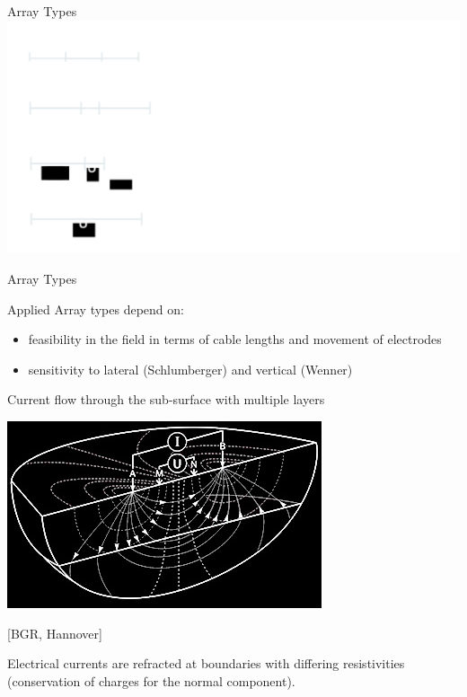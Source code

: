 \begin{frame}{Array Types}
  \includegraphics[width=0.9\linewidth]{Figures/Resistivity/ArrayTypes.png}
\end{frame}

\begin{frame}{Array Types}
  \begin{PointSix}
    Applied Array types depend on:
    \begin{itemize}
      \item feasibility in the field in terms of cable lengths and movement of electrodes
      \item sensitivity to lateral (Schlumberger) and vertical (Wenner)
    \end{itemize}
  \end{PointSix}
\end{frame}


\begin{frame}{Current flow through the sub-surface with multiple layers}
  \begin{center}
        \includegraphics[width=0.5\linewidth]{Figures/Resistivity/SchlumbergerSounding_BGR.jpg}

        \tiny [BGR, Hannover]

        \small Electrical currents are refracted at boundaries with differing resistivities (conservation of charges for the normal component).

\end{center}
\end{frame}

